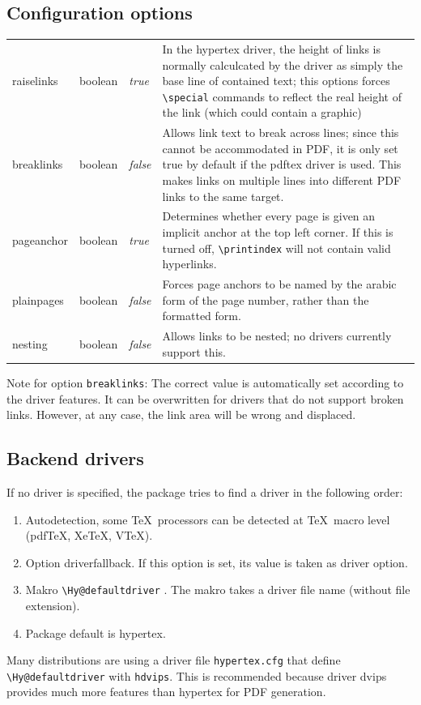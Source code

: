 \documentclass[pdftex]{article}
\newcommand*{\cs}[1]{%
  \texttt{\textbackslash #1}%
}
\begin{document}
\subsection{Configuration options}

\noindent\begin{longtable}{>{\ttfamily}ll>{\itshape}lp{7cm}}
raiselinks & boolean & true  & In the hypertex driver, the height of links is normally calculcated by the driver as
                               simply the base line of contained text; this options forces \verb|\special| commands to
                               reflect the real height of the link (which could contain a graphic) \\
breaklinks & boolean & false & Allows link text to break across lines; since this cannot be accommodated in PDF, it is
                               only set true by default if the pdftex driver is used. This makes links on multiple lines
                               into different PDF links to the same target. \\
pageanchor & boolean & true  & Determines whether every page is given an implicit anchor at the top left corner. If this
                               is turned off, \verb|\printindex| will not contain
                               valid hyperlinks. \\
plainpages & boolean & false & Forces page anchors to be named by the arabic form of the page number, rather than the
                               formatted form. \\
nesting    & boolean & false & Allows links to be nested; no drivers currently support this.
\end{longtable}

Note for option \verb|breaklinks|:
The correct value is automatically set according to the driver features.
It can be overwritten for drivers that do not support broken links.
However, at any case, the link area will be wrong and displaced.

\subsection{Backend drivers}

If no driver is specified, the package tries to find a driver in
the following order:
\begin{enumerate}
\item Autodetection, some \TeX\ processors can be detected at \TeX\ macro
  level (pdf\TeX, Xe\TeX, V\TeX).
\item Option \textsf{driverfallback}. If this option is set, its value
  is taken as driver option.
\item Makro \cs{Hy@defaultdriver}. The makro takes a driver file
  name (without file extension).
\item Package default is \textsf{hypertex}.
\end{enumerate}
Many distributions are using a driver file \texttt{hypertex.cfg} that
define \cs{Hy@defaultdriver} with \texttt{hdvips}. This is recommended
because driver \textsf{dvips} provides much more features than
\textsf{hypertex} for PDF generation.
\end{document}
